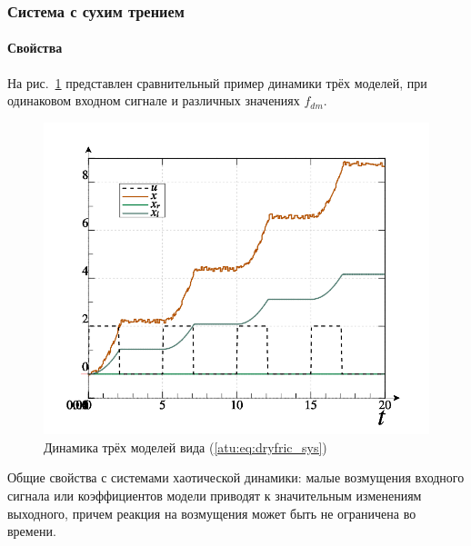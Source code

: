 \documentclass[10pt,utf8]{beamer}
\newlength\TW
\begin{document}
\begin{frame}
  \frametitle{Система с сухим трением}
  \framesubtitle{Свойства}

  На рис.~\ref{atu:f:fric_outs} представлен сравнительный пример динамики трёх
  моделей, при одинаковом входном сигнале
  и различных значениях $f_{dm}$.

  \vspace{-1ex}

  \begin{figure}[htb!]
    \centerline{
      \includegraphics[width=46\TW]{p/fric/frict_id_u2-g_uxe.png}
    }
    \caption{Динамика трёх моделей вида (\ref{atu:eq:dryfric_sys})}
    \label{atu:f:fric_outs}
  \end{figure}
  \vspace{-4ex}

  Общие свойства с системами хаотической динамики:
  малые возмущения входного сигнала
  или коэффициентов модели приводят к значительным изменениям
  выходного, причем реакция на возмущения может быть
  не ограничена во времени.


\end{frame}

\end{document}
